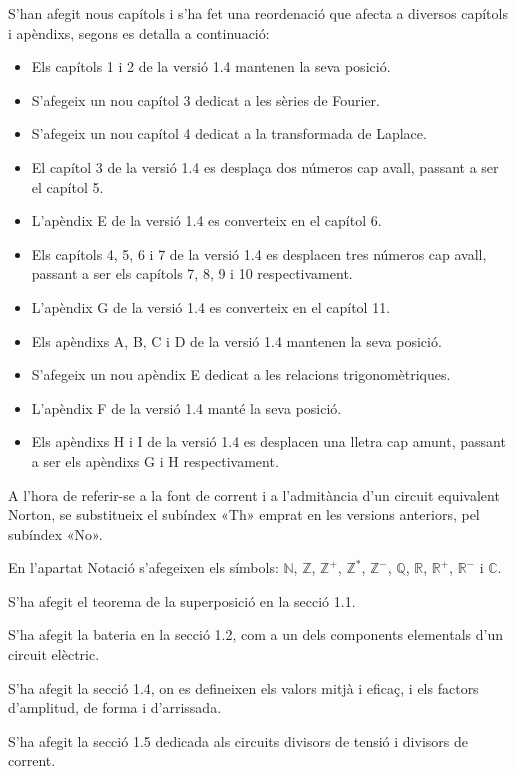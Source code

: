 S'han afegit nous capítols i s'ha fet una reordenació que afecta a
diversos capítols i apèndixs, segons es detalla a continuació:
\begin{itemize}
   \item Els capítols 1 i 2  de la versió 1.4 mantenen la seva posició.
   \item S'afegeix un nou capítol 3 dedicat a les sèries de Fourier.
   \item S'afegeix un nou capítol 4 dedicat a la transformada de Laplace.
   \item El capítol 3 de la versió 1.4 es desplaça dos números cap
    avall, passant a ser el capítol 5.
   \item L'apèndix E de la versió 1.4 es converteix en el capítol 6.
   \item Els capítols 4, 5, 6 i 7  de la versió 1.4 es desplacen tres números cap
    avall, passant a ser els capítols 7, 8, 9 i 10 respectivament.
    \item L'apèndix G de la versió 1.4 es converteix en el capítol 11.
    \item Els apèndixs A, B, C i D de la versió 1.4 mantenen la seva posició.
    \item S'afegeix un nou apèndix E dedicat a les relacions trigonomètriques.
    \item L'apèndix F de la versió 1.4 manté la seva posició.
    \item Els apèndixs H i I de la versió 1.4 es desplacen una lletra cap
    amunt, passant a ser els apèndixs G i H respectivament.
\end{itemize}


 A l'hora de referir-se a la font de corrent i a l'admitància d'un circuit equivalent
 Norton, se substitueix el subíndex «Th» emprat en les versions
anteriors, pel subíndex «No».

En l'apartat Notació s'afegeixen els símbols: $\mathbb{N}$,
$\mathbb{Z}$, $\mathbb{Z}^+$,  $\mathbb{Z}^*$, $\mathbb{Z}^-$,
$\mathbb{Q}$, $\mathbb{R}$, $\mathbb{R}^+$, $\mathbb{R}^-$ i
$\mathbb{C}$.

S'ha afegit el teorema de la superposició en la secció 1.1.


S'ha afegit la bateria en la secció 1.2, com a un
dels components elementals d'un circuit elèctric.

S'ha afegit la secció 1.4, on es defineixen els
valors mitjà i eficaç, i els factors d'amplitud, de forma i
d'arrissada.

S'ha afegit la secció 1.5 dedicada als
circuits divisors de tensió i divisors de corrent.

